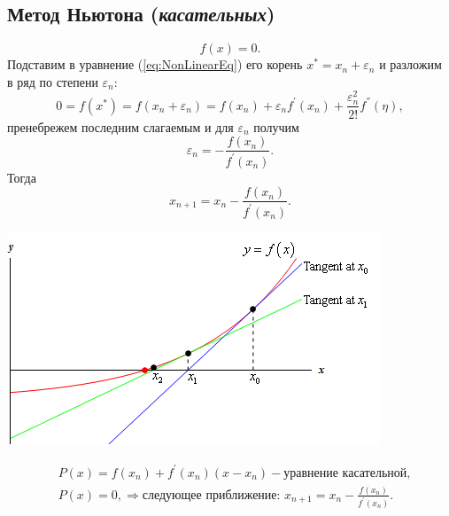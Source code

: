 \documentclass[a4paper,11pt]{article}
\begin{document}
\subsection{Метод Ньютона (\textit{касательных})}
\begin{equation}
  f(x) = 0.
  \label{eq:NonlinearEq}
\end{equation}
Подставим в уравнение (\ref{eq:NonLinearEq}) его корень $x^*=x_n+\varepsilon_n$ и разложим \\ в ряд по степени $\varepsilon_n$:
\begin{equation}
  0 = f(x^*) = f(x_n+\varepsilon_n) = f(x_n)+\varepsilon_nf^{'}(x_n)+\frac{\varepsilon_n^2}{2!}f^{''}(\eta),
\end{equation}
пренебрежем последним слагаемым и для $\varepsilon_n$ получим
\begin{equation*}
  \varepsilon_n = - \frac{f(x_n)}{f^{'}(x_n)}.
\end{equation*}
Тогда
\begin{equation}
  x_{n+1} = x_n - \frac{f(x_n)}{f^{'}(x_n)}.
\end{equation}

\begin{center}
  \includegraphics[scale=0.8]{img1.png}
\end{center}

\begin{align*}
  &P(x) = f(x_n) + f^{'}(x_n)(x-x_n) - \text{уравнение касательной}, \\
  &P(x) = 0, \Rightarrow \text{следующее приближение: } x_{n+1} = x_n - \frac{f(x_n)}{f^{'}(x_n)}.
\end{align*}
\end{document}
